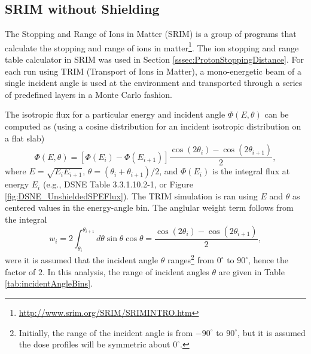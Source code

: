 \documentclass{hitec}
\begin{document}
\subsection{SRIM without Shielding}\label{ssec:SRIMnoShielding}

The Stopping and Range of Ions in Matter (SRIM) \citep{ziegler2009srim} is a group of programs that calculate the stopping and range of ions in matter\footnote{\url{http://www.srim.org/SRIM/SRIMINTRO.htm}}. The ion stopping and range table calculator in SRIM was used in Section \ref{sssec:ProtonStoppingDistance}. For each run using TRIM (Transport of Ions in Matter), a mono-energetic beam of a single incident angle is used at the environment and transported through a series of predefined layers in a Monte Carlo fashion.

The isotropic flux for a particular energy and incident angle $\Phi(E,\theta)$ can be computed as (using a cosine distribution for an incident isotropic distribution on a flat slab)
\begin{equation}
\Phi(E,\theta) = [\Phi(E_i) - \Phi(E_{i+1})] \frac{\cos(2\theta_i) - \cos(2\theta_{i+1})}{2},
\end{equation}
where $E = \sqrt{E_i E_{i+1}}$, $\theta = (\theta_i + \theta_{i+1})/2$, and $\Phi(E_i)$ is the integral flux at energy $E_i$ (e.g., DSNE Table 3.3.1.10.2-1, or Figure \ref{fig:DSNE_UnshieldedSPEFlux}). The TRIM simulation is ran using $E$ and $\theta$ as centered values in the energy-angle bin. The anglular weight term follows from the integral
\begin{equation}
w_i = 2\int_{\theta_i}^{\theta_{i+1}}d\theta\sin\theta\cos\theta = \frac{\cos(2\theta_i) - \cos(2\theta_{i+1})}{2},
\end{equation}
were it is assumed that the incident angle $\theta$ ranges\footnote{Initially, the range of the incident angle is from $-90^\circ$ to $90^\circ$, but it is assumed the dose profiles will be symmetric about $0^\circ$.} from $0^\circ$ to $90^\circ$, hence the factor of $2$. In this analysis, the range of incident angles $\theta$ are given in Table \ref{tab:incidentAngleBins}.
\end{document}
